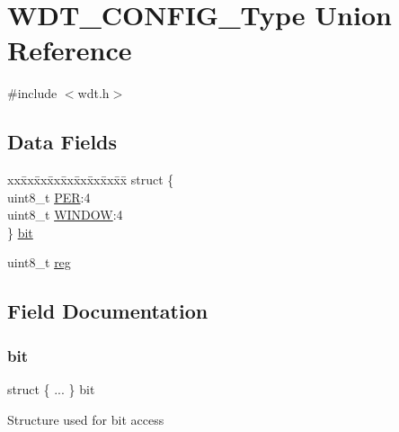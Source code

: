 \hypertarget{union_w_d_t___c_o_n_f_i_g___type}{}\section{W\+D\+T\+\_\+\+C\+O\+N\+F\+I\+G\+\_\+\+Type Union Reference}
\label{union_w_d_t___c_o_n_f_i_g___type}


{\ttfamily \#include $<$wdt.\+h$>$}

\subsection*{Data Fields}
\begin{DoxyCompactItemize}
\item 
\begin{tabbing}
xx\=xx\=xx\=xx\=xx\=xx\=xx\=xx\=xx\=\kill
struct \{\\
\>uint8\_t \mbox{\hyperlink{union_w_d_t___c_o_n_f_i_g___type_a7368ef79c463d39c82b562902306733a}{PER}}:4\\
\>uint8\_t \mbox{\hyperlink{union_w_d_t___c_o_n_f_i_g___type_ab1ebb59c38d77ff60d2152e0e5b8c9de}{WINDOW}}:4\\
\} \mbox{\hyperlink{union_w_d_t___c_o_n_f_i_g___type_a1b1348f56d6db9aed883b4161ce910e5}{bit}}\\

\end{tabbing}\item 
uint8\+\_\+t \mbox{\hyperlink{union_w_d_t___c_o_n_f_i_g___type_a9428adc9af4653a2050e2536b55dec8d}{reg}}
\end{DoxyCompactItemize}


\subsection{Field Documentation}
\mbox{\label{union_w_d_t___c_o_n_f_i_g___type_a1b1348f56d6db9aed883b4161ce910e5}} 
\subsubsection{\texorpdfstring{bit}{bit}}
{\footnotesize\ttfamily struct \{ ... \}   bit}

Structure used for bit access \mbox{\label{union_w_d_t___c_o_n_f_i_g___type_a7368ef79c463d39c82b562902306733a}} 
